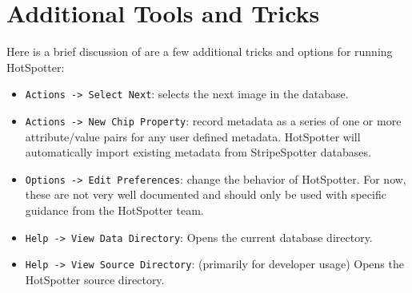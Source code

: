 \documentclass[a4paper,10pt]{article}
\begin{document}
\section{Additional Tools and Tricks}


Here is a brief discussion of are a few additional tricks and options
for running HotSpotter:
\begin{itemize}
\item \verb+Actions -> Select Next+:
    selects the next image in the database. 

\item \verb+Actions -> New Chip Property+:  
    record metadata as a series of one or more attribute/value pairs for any
    user defined metadata.  HotSpotter will automatically import existing
    metadata from StripeSpotter databases.



\item \verb+Options -> Edit Preferences+: 
    change the behavior of HotSpotter. For now, these are not very well
    documented and should only be used with specific guidance from 
    the HotSpotter team.




\item \verb+Help -> View Data Directory+: 
    Opens the current database directory.

\item \verb+Help -> View Source Directory+: (primarily for developer usage)
    Opens the HotSpotter source directory. 


\end{itemize}
\end{document}
